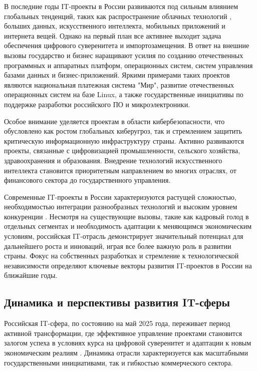 В последние годы IT-проекты в России развиваются под сильным влиянием глобальных тенденций, таких как распространение облачных технологий \cite{management10}, больших данных, искусственного интеллекта, мобильных приложений и интернета вещей. Однако на первый план все активнее выходит задача обеспечения цифрового суверенитета и импортозамещения. В ответ на внешние вызовы государство и бизнес наращивают усилия по созданию отечественных программных и аппаратных платформ, операционных систем, систем управления базами данных и бизнес-приложений. Яркими примерами таких проектов являются национальная платежная система "Мир", развитие отечественных операционных систем на базе Linux, а также государственные инициативы по поддержке разработки российского ПО и микроэлектроники.

Особое внимание уделяется проектам в области кибербезопасности, что обусловлено как ростом глобальных киберугроз, так и стремлением защитить критическую информационную инфраструктуру страны. Активно развиваются проекты, связанные с цифровизацией промышленности, сельского хозяйства, здравоохранения и образования. Внедрение технологий искусственного интеллекта становится приоритетным направлением во многих отраслях, от финансового сектора до государственного управления.

Современные IT-проекты в России характеризуются растущей сложностью, необходимостью интеграции разнообразных технологий и высоким уровнем конкуренции \cite{management2}. Несмотря на существующие вызовы, такие как кадровый голод в отдельных сегментах и необходимость адаптации к меняющимся экономическим условиям, российская IT-отрасль демонстрирует значительный потенциал для дальнейшего роста и инноваций, играя все более важную роль в развитии страны. Фокус на собственных разработках и стремление к технологической независимости определяют ключевые векторы развития IT-проектов в России на ближайшие годы.

\subsection{Динамика и перспективы развития IT-сферы}
Российская IT-сфера, по состоянию на май 2025 года, переживает период активной трансформации, где эффективное управление проектами становится залогом успеха в условиях курса на цифровой суверенитет и адаптации к новым экономическим реалиям \cite{management1}. Динамика отрасли характеризуется как масштабными государственными инициативами, так и гибкостью коммерческого сектора.

